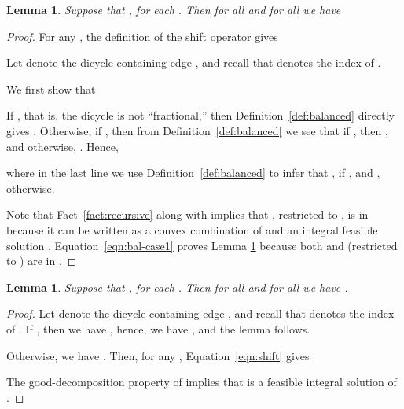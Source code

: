 \documentclass[11pt]{article}
\newtheorem{lemma}[theorem]{Lemma}
\begin{document}
\begin{lemma}
\label{lemma:cond1}
Suppose that ,
for each .
Then for all  and for all  we have

\end{lemma}
\begin{proof}
For any , the definition of the shift operator gives

Let  denote the dicycle containing edge , and recall
that  denotes the index of .

We first show that

If , that is, the dicycle 
is not ``fractional,'' then Definition~\ref{def:balanced} directly
gives .
Otherwise, if , then
from Definition~\ref{def:balanced} we see that
if , then
,
and otherwise,
.
Hence,


where in the last line we use Definition~\ref{def:balanced} to infer
that
 , if
, and
 , otherwise.

Note that Fact~\ref{fact:recursive} along with  implies that
, restricted to ,
is in  because
it can be written as a convex combination of  and an
integral feasible solution .
Equation~\eqref{eqn:bal-case1} proves Lemma \ref{lemma:cond1} because
both  and
 (restricted to ) are in
.
 \end{proof}


\begin{lemma}
\label{lemma:cond2}
Suppose that ,
for each .
Then for all  and for all  we have
.
\end{lemma}

\begin{proof}
Let  denote the dicycle containing edge , and recall
that  denotes the index of .
If ,
then we have ,
hence, we have , and
the lemma follows.

Otherwise, we have .
Then, for any , Equation~\eqref{eqn:shift} gives

The good-decomposition property of  implies that
 is
a feasible integral solution of \\ .
\end{proof}
\end{document}
